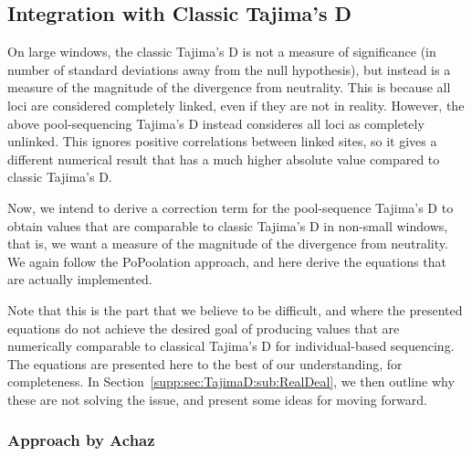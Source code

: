 \documentclass[a4paper,fontsize=9pt,DIV=14]{scrartcl}
\newcounter{todo}
\newcommand\todo[1]{}
\newcommand\secref[1]{Section~\ref{#1}}
\begin{document}



\subsection{Integration with Classic Tajima's D}
\label{supp:sec:TajimaD:sub:Classic}

On large windows, the classic Tajima's D is not a measure of significance (in number of standard deviations away from the null hypothesis), but instead is a measure of the magnitude of the divergence from neutrality.  This is because all loci are considered completely linked, even if they are not in reality.  However, the above pool-sequencing Tajima's D instead consideres all loci as completely unlinked. This ignores positive correlations between linked sites, so it gives a different numerical result that has a much higher absolute value compared to classic Tajima's D.

Now, we intend to derive a correction term for the pool-sequence Tajima's D to obtain values that are comparable to classic Tajima's D in non-small windows, that is, we want a measure of the magnitude of the divergence from neutrality.
We again follow the PoPoolation approach, and here derive the equations that are actually implemented. 

Note that this is the part that we believe to be difficult, and where the presented equations do not achieve the desired goal of producing values that are numerically comparable to classical Tajima's D for individual-based sequencing.  The equations are presented here to the best of our understanding, for completeness. In \secref{supp:sec:TajimaD:sub:RealDeal}, we then outline why these are not solving the issue, and present some ideas for moving forward.


\subsubsection*{Approach by Achaz}
\end{document}
